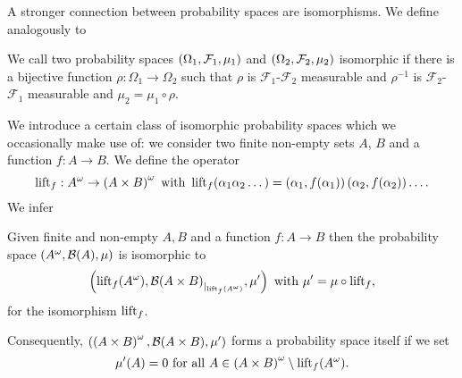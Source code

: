 A stronger connection between probability spaces are isomorphisms. We define
analogously to \cite[Definition 8.34]{Klenke}
\begin{definition}
  We call two probability spaces $\left(\Omega_{1}, \mathcal{F}_{1}, \mu_{1}\right)$
  and $\left(\Omega_{2}, \mathcal{F}_{2}, \mu_{2}\right)$ isomorphic if there is a
  bijective function $\rho:\Omega_{1}\rightarrow\Omega_{2}$ such that
  $\rho$ is $\mathcal{F}_{1}$-$\mathcal{F}_{2}$ measurable and $\rho^{-1}$ is
  $\mathcal{F}_{2}$-$\mathcal{F}_{1}$ measurable and 
  $\mu_{2} = \mu_{1}\circ\rho$.
\end{definition}
We introduce a certain class of isomorphic probability spaces which we 
occasionally make use of: we consider two finite non-empty sets $A$, $B$ and
a function $f:A\rightarrow B$. We define the operator
\begin{equation*}
  \operatorname{lift}_{f}:A^{\omega}\rightarrow\left(A\times B\right)^{\omega}
  \text{ with }\operatorname{lift}_{f}(\alpha_{1}\alpha_{2}\dots) = 
    \left(\alpha_{1}, f(\alpha_{1})\right)\left(\alpha_{2}, f(\alpha_{2})\right)\dots.
\end{equation*}
We infer
\begin{lemma}
  Given finite and non-empty $A, B$ and a function $f:A\rightarrow B$ then the
  probability space $\left(A^{\omega}, \mathcal{B}(A), \mu\right)$ is isomorphic to
  \begin{equation*}
    \left(\operatorname{lift}_{f}(A^{\omega}), 
      {\mathcal{B}(A\times B)}_{|_{\operatorname{lift}_{f}(A^{\omega})}}, \mu'
    \right) \text{ with } \mu' = \mu\circ\operatorname{lift}_{f},
  \end{equation*}
  for the isomorphism $\operatorname{lift}_{f}$.

  Consequently, $\left(\left(A\times B\right)^{\omega}, \mathcal{B}(A\times B), 
  \mu'\right)$ forms a probability space itself if we set
  \begin{equation*}
    \mu'(A) = 0\text{ for all }A\in
    \left(A\times B\right)^{\omega}\setminus\operatorname{lift}_{f}(A^{\omega}).
  \end{equation*}
  \label{lem:liftisomorphism}
\end{lemma}
